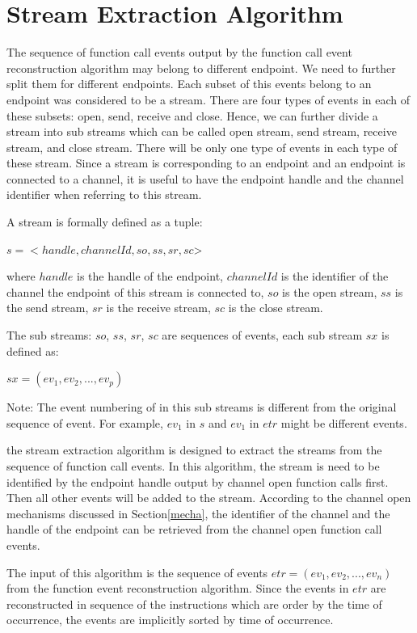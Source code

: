 \section{Stream Extraction Algorithm}
The sequence of function call events output by the function call event reconstruction algorithm may belong to different endpoint. We need to further split them for different endpoints.  Each subset of this events belong to an endpoint was considered to be a stream. There are four types of events in each of these subsets: open, send, receive and close. Hence, we can further divide a stream into sub streams which can be called open stream, send stream, receive stream, and close stream. There will be only one type of events in each type of these stream. Since a stream is corresponding to an endpoint and an endpoint is connected to a channel, it is useful to have the endpoint handle and the channel identifier when referring to this stream. 

A  stream is formally defined as a tuple:

$s = <handle, channelId, so, ss, sr, sc$>

where $handle$ is the handle of the endpoint, $channelId$ is the identifier of the channel the endpoint of this stream is connected to, $so$ is the open stream, $ss$ is the send stream, $sr$ is the receive stream, $sc$ is the close stream. 

The sub streams: $so$, $ss$, $sr$, $sc$ are sequences of events, each sub stream $sx$ is defined as:

$sx = (ev_1, ev_2, ..., ev_p)$

Note: The event numbering of in this sub streams is different from the original sequence of event. For example, $ev_1$ in $s$ and $ev_1$ in $etr$ might be different events.

the stream extraction algorithm is designed to extract the streams from the sequence of function call events. In this algorithm, the stream is need to be identified by the endpoint handle output by channel open function calls first. Then all other events will be added to the stream.  According to the channel open mechanisms discussed in Section\ref{mecha}, the identifier of the channel and the handle of the endpoint can be retrieved from the channel open function call events.

The input of this algorithm is the sequence of events $etr = (ev_1, ev_2, ..., ev_n)$ from the function event reconstruction algorithm. Since the events in $etr$ are reconstructed in sequence of the instructions which are order by the time of occurrence, the events are implicitly sorted by time of occurrence. 

